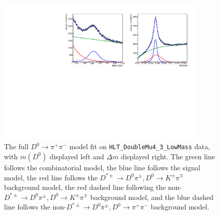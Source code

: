 \begin{figure}[htp]
    \begin{center}
      \includegraphics[width=0.9\textwidth]{figures/chapter4/normalization_fit/dpipi_fit.pdf}
    \end{center}
    \caption{
      The full $D^0 \to \pi^+ \pi^-$ model fit on \texttt{HLT\_DoubleMu4\_3\_LowMass} data, with $m(D^0)$ displayed left and $\Delta m$ displayed right. The green line follows the combinatorial model, the blue line follows the signal model, the red line follows the $D^{*\pm} \to D^0\pi^\pm, D^0 \to K^\pm \pi^\mp$ background model, the red dashed line following the non-$D^{*\pm} \to D^0\pi^\pm, D^0 \to K^\pm \pi^\mp$ background model, and the blue dashed line follows the non-$D^{*\pm} \to D^0\pi^\pm, D^0 \to \pi^+ \pi^-$ background model.
    }
    \label{fig:d0pipi_uml_fit_dimuon}
\end{figure}


